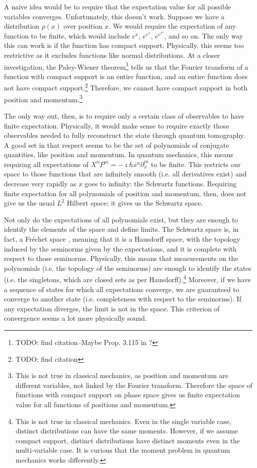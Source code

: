 \documentclass[10pt,twocolumn, nofootinbib]{revtex4-2}
\begin{document}
A naive idea would be to require that the expectation value for all possible variables converges. Unfortunately, this doesn't work. Suppose we have a distribution $\rho(x)$ over position $x$. We would require the expectation of any function to be finite, which would include $e^x$, $e^{e^x}$, $e^{e^{e^x}}$, and so on. The only way this can work is if the function has compact support. Physically, this seems too restrictive as it excludes functions like normal distributions. At a closer investigation, the Paley-Wiener theorem\footnote{TODO: find citation--Maybe Prop. 3.115 in \cite{moretti_spectral_2017}?} tells us that the Fourier transform of a function with compact support is an entire function, and an entire function does not have compact support.\footnote{TODO: find citation} Therefore, we cannot have compact support in both position and momentum.\footnote{This is not true in classical mechanics, as position and momentum are different variables, not linked by the Fourier transform. Therefore the space of functions with compact support on phase space gives us finite expectation value for all functions of positions and momentum.}

The only way out, then, is to require only a certain class of observables to have finite expectation. Physically, it would make sense to require exactly those observables needed to fully reconstruct the state through quantum tomography. A good set in that respect seems to be the set of polynomials of conjugate quantities, like position and momentum. In quantum mechanics, this means requiring all expectations of $X^nP^m = -\imath \hbar x^n\partial_x ^m$ to be finite. This restricts our space to those functions that are infinitely smooth (i.e. all derivatives exist) and decrease very rapidly as $x$ goes to infinity: the Schwartz functions. Requiring finite expectation for all polynomials of position and momentum, then, does not give us the usual $L^2$ Hilbert space; it gives us the Schwartz space.

Not only do the expectations of all polynomials exist, but they are enough to identify the elements of the space and define limits. The Schwartz space is, in fact, a Fréchet space \cite[Theorem V.9]{reed_methods_1980}, meaning that it is a Hausdorff space, with the topology induced by the seminorms given by the expectations, and it is complete with respect to those seminorms. Physically, this means that measurements on the polynomials (i.e. the topology of the seminorms) are enough to identify the states (i.e. the singletons, which are closed sets as per Hausdorff).\footnote{This is not true in classical mechanics. Even in the single variable case, distinct distributions can have the same moments. However, if we assume compact support, distinct distributions have distinct moments even in the multi-variable case.\cite{moment_problem_2017} It is curious that the moment problem in quantum mechanics works differently.} Moreover, if we have a sequence of states for which all expectations converge, we are guaranteed to converge to another state (i.e. completeness with respect to the seminorms). If any expectation diverges, the limit is not in the space. This criterion of convergence seems a lot more physically sound.
\end{document}
